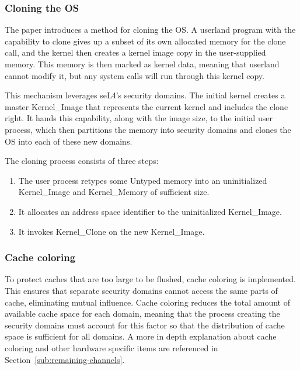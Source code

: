 \subsubsection{Cloning the OS}
The paper introduces a method for cloning the OS. A userland program with the
capability to clone gives up a subset of its own allocated memory for the clone
call, and the kernel then creates a kernel image copy in the user-supplied
memory. This memory is then marked as kernel data, meaning that userland cannot
modify it, but any system calls will run through this kernel copy.

This mechanism leverages seL4's security domains. The initial kernel creates a
master Kernel\_Image that represents the current kernel and includes the clone
right. It hands this capability, along with the image size, to the initial user
process, which then partitions the memory into security domains and clones the
OS into each of these new domains.

The cloning process consists of three steps:
\begin{enumerate}
  \item The user process retypes some Untyped memory into an uninitialized
    Kernel\_Image and Kernel\_Memory of sufficient size.
  \item It allocates an address space identifier to the uninitialized
    Kernel\_Image.
  \item It invokes Kernel\_Clone on the new Kernel\_Image.
\end{enumerate}

\subsubsection{Cache coloring}
To protect caches that are too large to be flushed, cache coloring is
implemented. This ensures that separate security domains cannot access the same
parts of cache, eliminating mutual influence. Cache coloring reduces the total
amount of available cache space for each domain, meaning that the process
creating the security domains must account for this factor so that the
distribution of cache space is sufficient for all domains. A more in depth
explanation about cache coloring and other hardware specific items are
referenced in Section~\ref{sub:remaining-channels}.

